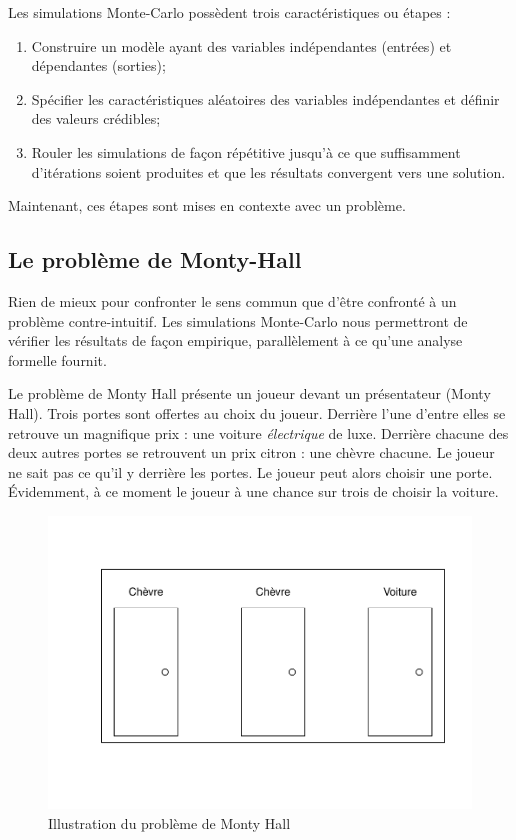 \documentclass[
]{book}
\begin{document}
Les simulations Monte-Carlo possèdent trois caractéristiques ou étapes :

\begin{enumerate}
\def\labelenumi{\arabic{enumi}.}
\item
  Construire un modèle ayant des variables indépendantes (entrées) et dépendantes (sorties);
\item
  Spécifier les caractéristiques aléatoires des variables indépendantes et définir des valeurs crédibles;
\item
  Rouler les simulations de façon répétitive jusqu'à ce que suffisamment d'itérations soient produites et que les résultats convergent vers une solution.
\end{enumerate}

Maintenant, ces étapes sont mises en contexte avec un problème.

\hypertarget{le-probluxe8me-de-monty-hall}{%
\subsection{Le problème de Monty-Hall}\label{le-probluxe8me-de-monty-hall}}

Rien de mieux pour confronter le sens commun que d'être confronté à un problème contre-intuitif. Les simulations Monte-Carlo nous permettront de vérifier les résultats de façon empirique, parallèlement à ce qu'une analyse formelle fournit.

Le problème de Monty Hall \autocite[attribuables à][]{Selvin75} présente un joueur devant un présentateur (Monty Hall). Trois portes sont offertes au choix du joueur. Derrière l'une d'entre elles se retrouve un magnifique prix : une voiture \emph{électrique} de luxe. Derrière chacune des deux autres portes se retrouvent un prix citron : une chèvre chacune. Le joueur ne sait pas ce qu'il y derrière les portes. Le joueur peut alors choisir une porte. Évidemment, à ce moment le joueur à une chance sur trois de choisir la voiture.

\begin{figure}
\centering
\includegraphics{10-Simuler_files/figure-latex/MH-1.pdf}
\caption{\label{fig:MH}Illustration du problème de Monty Hall}
\end{figure}
\end{document}
